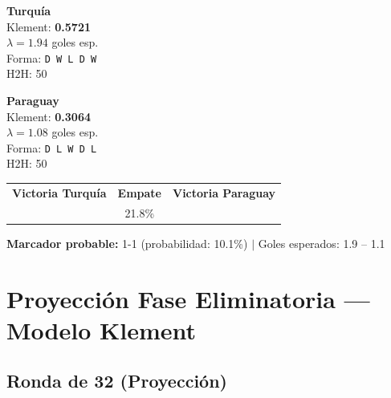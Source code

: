 \documentclass[11pt,a4paper]{article}
\begin{document}
\begin{tcolorbox}[colback=yellow!5, colframe=yellow!60!black, arc=5pt, 
  title={\textbf{Grupo D: Turquía \textbf{vs} Paraguay}}]

\begin{minipage}{0.48\textwidth}
  \centering
  {\Large\bfseries Turquía}\\[3pt]
  Klement: \textbf{0.5721} \\
  $\lambda = 1.94$ goles esp. \\
  Forma: \texttt{D W L D W}\\ 
  H2H: 50%
\end{minipage}
\hfill
\begin{minipage}{0.04\textwidth}
\end{minipage}
\hfill
\begin{minipage}{0.48\textwidth}
  \centering
  {\Large\bfseries Paraguay}\\[3pt]
  Klement: \textbf{0.3064} \\
  $\lambda = 1.08$ goles esp. \\
  Forma: \texttt{D L W D L}\\ 
  H2H: 50%
\end{minipage}

\vspace{0.4cm}
\centering
\begin{tabular}{ccc}
  \textbf{Victoria Turquía} & \textbf{Empate} & \textbf{Victoria Paraguay} \\[3pt]
  \cellcolor{yellow!25}{\LARGE\bfseries 57.5\%}
  & {\LARGE 21.8\%}
  & \cellcolor{red!25}{\LARGE\bfseries 20.7\%} \\
\end{tabular}

\vspace{0.3cm}
\textbf{Marcador probable:} 1-1 (probabilidad: 10.1\%)
\quad $|$ \quad Goles esperados: 1.9 -- 1.1
\end{tcolorbox}


\newpage

\section{Proyección Fase Eliminatoria — Modelo Klement}

\subsection{Ronda de 32 (Proyección)}
\end{document}
